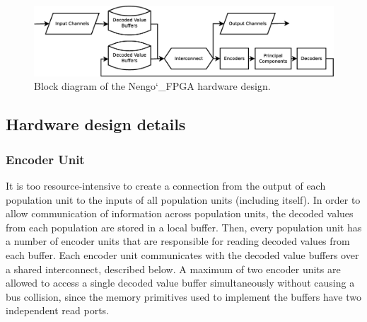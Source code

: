 \documentclass[english]{article}
\newcommand{\design}{Nengo\char`_FPGA}  %
\begin{document}
\begin{figure}
\centering

\includegraphics[width=6in]{system-block-diagram.eps}

\caption{Block diagram of the \design{} hardware design.}

\label{fig:system}
\end{figure}

\subsection{Hardware design details}

\subsubsection{Encoder Unit}

It is too resource-intensive to create a connection from the output of each population unit to the inputs of all population units (including itself).
In order to allow communication of information across population units, the decoded values from each population are stored in a local buffer.
Then, every population unit has a number of encoder units that are responsible for reading decoded values from each buffer. 
Each encoder unit communicates with the decoded value buffers over a shared interconnect, described below.
A maximum of two encoder units are allowed to access a single decoded value buffer simultaneously
without causing a bus collision, since the memory primitives used to implement the buffers have two independent read ports.
\end{document}
